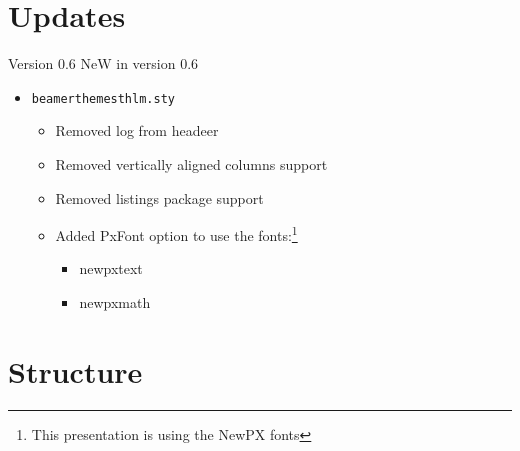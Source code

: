 \documentclass[compress,PxFont]{beamer}
\begin{document}
\section{Updates}


\begin{frame}[c]{Version 0.6}
\alert{NeW} in version 0.6

\begin{itemize}
	\item \texttt{beamerthemesthlm.sty}
	\begin{itemize}
		\item Removed log from headeer
		\item Removed vertically aligned columns support
		\item Removed listings package support
		\item Added PxFont option to use the fonts:\footnote{This presentation is using the NewPX fonts}
		\begin{itemize}
			\item newpxtext
			\item newpxmath 
		\end{itemize}
	\end{itemize}
\end{itemize}
\end{frame}


%
%
\section{Structure}

\end{document}
